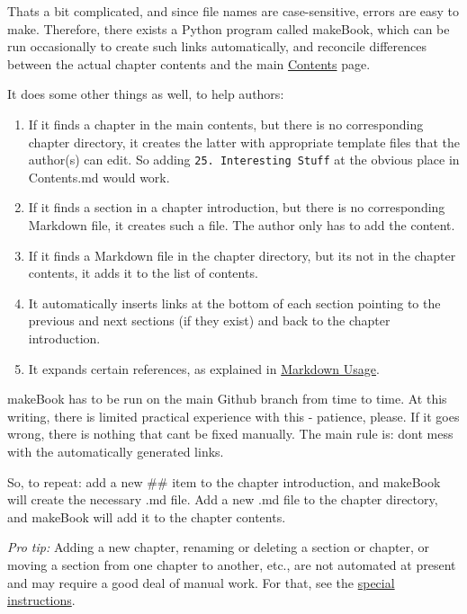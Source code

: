 \documentclass[
]{article}
\begin{document}
That\textquotesingle s a bit complicated, and since file names are
case-sensitive, errors are easy to make. Therefore, there exists a
Python program called makeBook, which can be run occasionally to create
such links automatically, and reconcile differences between the actual
chapter contents and the main \hyperref[list-of-contents]{Contents}
page.

It does some other things as well, to help authors:

\begin{enumerate}
\def\labelenumi{\arabic{enumi}.}
\item
  If it finds a chapter in the main contents, but there is no
  corresponding chapter directory, it creates the latter with
  appropriate template files that the author(s) can edit. So adding
  \texttt{25.\ Interesting\ Stuff} at the obvious place in Contents.md
  would work.
\item
  If it finds a section in a chapter introduction, but there is no
  corresponding Markdown file, it creates such a file. The author only
  has to add the content.
\item
  If it finds a Markdown file in the chapter directory, but
  it\textquotesingle s not in the chapter contents, it adds it to the
  list of contents.
\item
  It automatically inserts links at the bottom of each section pointing
  to the previous and next sections (if they exist) and back to the
  chapter introduction.
\item
  It expands certain references, as explained in
  \hyperref[markdown-usage]{Markdown Usage}.
\end{enumerate}

makeBook has to be run on the main Github branch from time to time. At
this writing, there is limited practical experience with this -
patience, please. If it goes wrong, there is nothing that
can\textquotesingle t be fixed manually. The main rule is:
don\textquotesingle t mess with the automatically generated links.

So, to repeat: add a new \#\# item to the chapter introduction, and
makeBook will create the necessary .md file. Add a new .md file to the
chapter directory, and makeBook will add it to the chapter contents.

\emph{Pro tip:} Adding a new chapter, renaming or deleting a section or
chapter, or moving a section from one chapter to another, etc., are not
automated at present and may require a good deal of manual work. For
that, see the
\href{https://github.com/becarpenter/book6/blob/main/utilities/chapterReorg.md}{special
instructions}.
\end{document}
